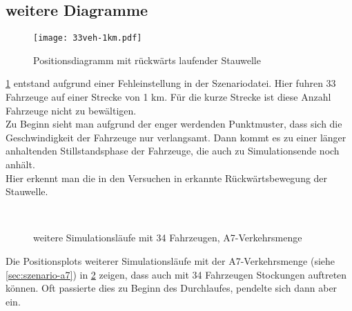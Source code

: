 \newpage

\subsection*{weitere Diagramme}


\begin{figure}[hptb]
 \centering
 \texttt{[image: 33veh-1km.pdf]}
 \caption{Positionsdiagramm mit rückwärts laufender Stauwelle}
 \label{figure:33veh-1km}
\end{figure}

\cref{figure:33veh-1km} entstand aufgrund einer Fehleinstellung in der Szenariodatei.
Hier fuhren 33 Fahrzeuge auf einer Strecke von 1 km.
Für die kurze Strecke ist diese Anzahl Fahrzeuge nicht zu bewältigen.
\\
Zu Beginn sieht man aufgrund der enger werdenden Punktmuster, dass sich die Geschwindigkeit der Fahrzeuge nur verlangsamt. Dann kommt es zu einer länger anhaltenden Stillstandsphase der Fahrzeuge, die auch zu Simulationsende noch anhält.
\\
Hier erkennt man die in den Versuchen in \cite{na-sch} erkannte Rückwärtsbewegung der Stauwelle.
\\




\begin{figure}[hptb]
  \centering
    \\
  \caption{weitere Simulationsläufe mit 34 Fahrzeugen, A7-Verkehrsmenge}
  \label{figure:a7-34veh-more}
\end{figure}

\vspace{2.5em}
Die Positionsplots weiterer Simulationsläufe mit der A7-Verkehrsmenge (siehe \cref{sec:szenario-a7}) in \cref{figure:a7-34veh-more} zeigen, dass auch mit 34 Fahrzeugen Stockungen auftreten können.
Oft passierte dies zu Beginn des Durchlaufes, pendelte sich dann aber ein.


